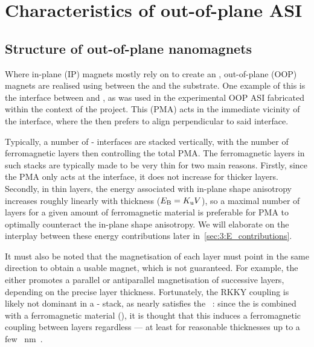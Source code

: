 \newpage
\section{Characteristics of out-of-plane ASI}
\subsection{Structure of out-of-plane nanomagnets}\label{sec:3:OOP_nanomagnet_PMA} %
Where in-plane (IP) magnets mostly rely on  to create an , out-of-plane (OOP) magnets are realised using  between the  and the substrate.
One example of this is the interface between  and , as was used in the experimental OOP ASI fabricated within the context of the \spinengine project.
This  (PMA) acts in the immediate vicinity of the interface, where the  then prefers to align perpendicular to said interface. \par
Typically, a number of - interfaces are stacked vertically, with the number of ferromagnetic  layers then controlling the total PMA.
The ferromagnetic layers in such stacks are typically made to be very thin for two main reasons.
Firstly, since the PMA only acts at the interface, it does not increase for thicker layers.
Secondly, in thin layers, the energy associated with in-plane shape anisotropy increases roughly linearly with thickness ($E_\mathrm{B}=K_\mathrm{u}V$), so a maximal number of layers for a given amount of ferromagnetic material is preferable for PMA to optimally counteract the in-plane shape anisotropy.
We will elaborate on the interplay between these energy contributions later in~\cref{sec:3:E_contributions}. \par
It must also be noted that the magnetisation of each  layer must point in the same direction to obtain a usable magnet, which is not guaranteed.
For example, the ~\cite{RKKY_RK,RKKY_K,RKKY_Y} either promotes a parallel or antiparallel magnetisation of successive  layers, depending on the precise  layer thickness.
Fortunately, the RKKY coupling is likely not dominant in a - stack, as  nearly satisfies the ~\cite{PtMagneticOrder}: since the  is combined with a ferromagnetic material (), it is thought that this induces a ferromagnetic coupling between  layers regardless --- at least for reasonable  thicknesses up to a few \SI{}{\nano\metre}~\cite{PerpendicularMagnetizationASI}.

